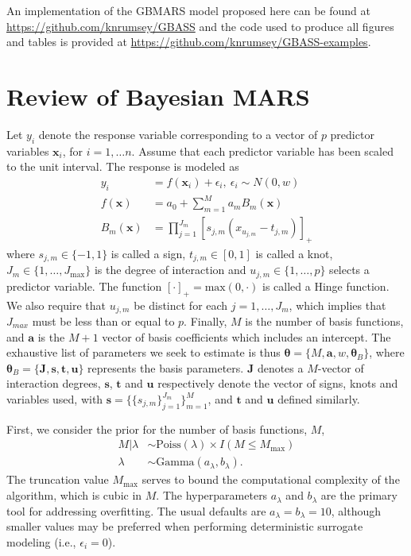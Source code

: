 \documentclass{article} %
\begin{document}
An implementation of the GBMARS model proposed here can be found at \url{https://github.com/knrumsey/GBASS} and the code used to produce all figures and tables is provided at \url{https://github.com/knrumsey/GBASS-examples}.




\section{Review of Bayesian MARS}
\label{sec:BMARS}

Let $y_i$ denote the response variable corresponding to a vector of $p$ predictor variables $\bm x_i$, for $i=1,\ldots n$. Assume that each predictor variable has been scaled to the unit interval. The response is modeled as
\begin{equation}
\label{eq:bmars}
    \begin{aligned}
        y_i &= f(\bm x_i) + \epsilon_i, \ \epsilon_i \sim N(0, w) \\
        f(\bm x) &= a_0 + \sum_{m=1}^Ma_mB_m(\bm x) \\
        B_m(\bm x) &= \prod_{j=1}^{J_m}\left[s_{j,m}(x_{u_{j,m}} - t_{j,m})\right]_+
    \end{aligned}
\end{equation}
where $s_{j,m} \in \{-1,1\}$ is called a sign, $t_{j,m} \in [0,1]$ is called a knot, $J_m \in \{1,\ldots, J_\text{max}\}$ is the degree of interaction and $u_{j,m} \in \{1,\ldots, p\}$ selects a predictor variable. The function $[\cdot]_+ = \text{max}(0, \cdot)$ is called a Hinge function. We also require that $u_{j,m}$ be distinct for each $j=1,\ldots, J_m$, which implies that $J_{max}$ must be less than or equal to $p$. Finally, $M$ is the number of basis functions, and $\bm a$ is the $M+1$ vector of basis coefficients which includes an intercept. The exhaustive list of parameters we seek to estimate is thus $\bm \theta = \{M, \bm a, w, \bm\theta_B\}$, where $\bm\theta_B = \{ \bm J, \bm s, \bm t, \bm u\}$ represents the basis parameters. $\bm J$ denotes a $M$-vector of interaction degrees, $\bm s$, $\bm t$ and $\bm u$ respectively denote the vector of signs, knots and  variables used, with $\bm s = \{\{s_{j,m}\}_{j=1}^{J_m}\}_{m=1}^M$, and $\bm t$ and $\bm u$ defined similarly.  

First, we consider the prior for the number of basis functions, $M$,
\begin{equation}\label{eq:prior_M}
\begin{aligned}
M|\lambda &\sim \text{Poiss}(\lambda)\times I(M \leq M_\text{max}) \\
\lambda &\sim \text{Gamma}(a_\lambda, b_\lambda).
\end{aligned}
\end{equation}
The truncation value $M_\text{max}$ serves to bound the computational complexity of the algorithm, which is cubic in $M$. The hyperparameters $a_\lambda$ and $b_\lambda$ are the primary tool for addressing overfitting. The usual defaults are $a_\lambda=b_\lambda=10$, although smaller values may be preferred when performing deterministic surrogate modeling (i.e., $\epsilon_i = 0$). 
\end{document}
